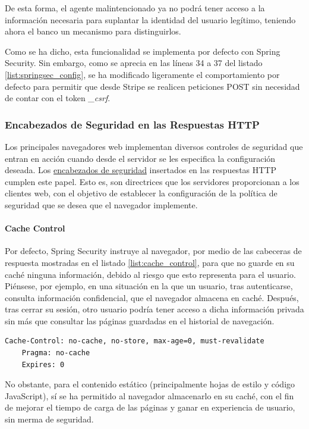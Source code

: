 \documentclass[a4paper]{article}
\begin{document}
	De esta forma, el agente malintencionado ya no podrá tener acceso a la información necesaria para suplantar la identidad del usuario legítimo, teniendo ahora el banco un mecanismo para distinguirlos.
	
	Como se ha dicho, esta funcionalidad se implementa por defecto con Spring Security. Sin embargo, como se aprecia en las líneas 34 a 37 del listado \ref{list:springsec_config}, se ha modificado ligeramente el comportamiento por defecto para permitir que desde Stripe se realicen peticiones POST sin necesidad de contar con el token \emph{\_csrf}.
	
	\subsubsection[Encabezados HTTP]{Encabezados de Seguridad en las Respuestas HTTP}
	Los principales navegadores web implementan diversos controles de seguridad que entran en acción cuando desde el servidor se les especifica la configuración deseada. Los \href{https://owasp.org/www-project-secure-headers/}{encabezados de seguridad} insertados en las respuestas HTTP cumplen este papel. Esto es, son directrices que los servidores proporcionan a los clientes web, con el objetivo de establecer la configuración de la política de seguridad que se desea que el navegador implemente.
	
	\paragraph{Cache Control}
	Por defecto, Spring Security instruye al navegador, por medio de las cabeceras de respuesta mostradas en el listado \ref{list:cache_control}, para que no guarde en su caché ninguna información, debido al riesgo que esto representa para el usuario. Piénsese, por ejemplo, en una situación en la que un usuario, tras autenticarse, consulta información confidencial, que el navegador almacena en caché. Después, tras cerrar su sesión, otro usuario podría tener acceso a dicha información privada sin más que consultar las páginas guardadas en el historial de navegación.
	\\
	
	\begin{lstlisting}[caption=Cabeceras para impedir el almacenamiento en caché, label=list:cache_control]
	Cache-Control: no-cache, no-store, max-age=0, must-revalidate 
	Pragma: no-cache
	Expires: 0
	\end{lstlisting}
	
	No obstante, para el contenido estático (principalmente hojas de estilo y código JavaScript), sí se ha permitido al navegador almacenarlo en su caché, con el fin de mejorar el tiempo de carga de las páginas y ganar en experiencia de usuario, sin merma de seguridad.
\end{document}
